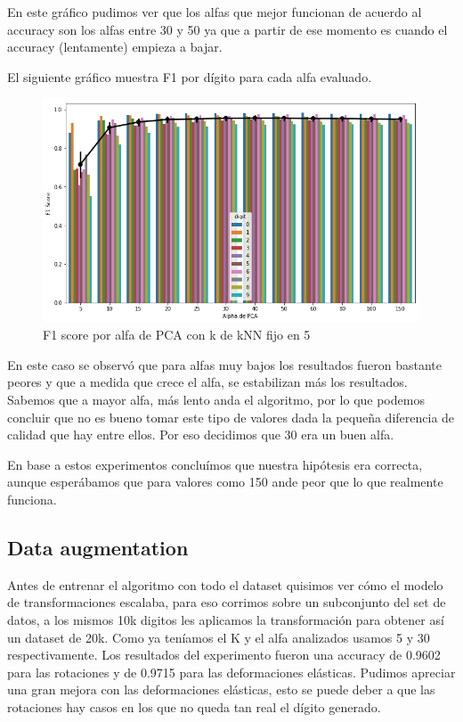 En este gráfico pudimos ver que los alfas que mejor funcionan de acuerdo al accuracy son los alfas entre 30 y 50 ya que a partir de ese momento es cuando el accuracy (lentamente) empieza a bajar.

El siguiente gráfico muestra F1 por dígito para cada alfa evaluado.

\begin{figure}[H]
    \begin{center}
      \includegraphics[width=0.8\columnwidth]{imagenes/F1_per_digit.png}
      \caption{F1 score por alfa de PCA con k de kNN fijo en 5}
    \end{center}
\end{figure}

En este caso se observó que para alfas muy bajos los resultados fueron bastante peores y que a medida que crece el alfa, se estabilizan más los resultados. 
Sabemos que a mayor alfa, más lento anda el algoritmo, por lo que podemos concluir que no es bueno tomar este tipo de valores dada la pequeña diferencia de calidad que hay entre ellos. Por eso decidimos que 30 era un buen alfa.

En base a estos experimentos concluímos que nuestra hipótesis era correcta, aunque esperábamos que para valores como 150 ande peor que lo que realmente funciona.

\subsection{Data augmentation}

Antes de entrenar el algoritmo con todo el dataset quisimos ver cómo el modelo de transformaciones escalaba, para eso corrimos sobre un subconjunto del set de datos, a los mismos 10k digitos les aplicamos la transformación para obtener así un dataset de 20k. Como ya teníamos el K y el alfa analizados usamos 5 y 30 respectivamente. Los resultados del experimento fueron una accuracy de 0.9602 para las rotaciones y de 0.9715 para las deformaciones elásticas. Pudimos apreciar una gran mejora con las deformaciones elásticas, esto se puede deber a que las rotaciones hay casos en los que no queda tan real el dígito generado.